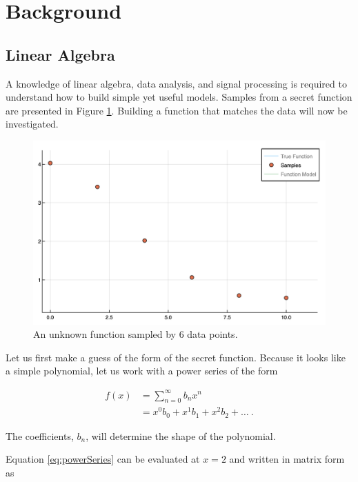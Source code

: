 \section{Background}\label{Sect:background}
\subsection{Linear Algebra}\label{Sect:linearAlgebra}
A knowledge of linear algebra, data analysis, and signal processing is required to understand how to build simple yet useful models. Samples from a secret function are presented in Figure \ref{fig:func1Samples}. Building a function that matches the data will now be investigated.

\begin{figure}[h]
\includegraphics[scale = 0.4]{Figures/func1Samples}
\caption{An unknown function sampled by 6 data points.
\label{fig:func1Samples}} 
\end{figure}

\par Let us first make a guess of the form of the secret function. Because it looks like a simple polynomial, let us work with a power series of the form

\begin{align}
f(x) &= \sum_{n=0}^\infty b_n x^n
	\label{eq:powerSum}\\ 
&= x^0b_0 + x^1b_1 + x^2b_2 + \ldots\ .
	\label{eq:powerSeries}
\end{align}

\par The coefficients, $b_n$, will determine the shape of the polynomial.

Equation \ref{eq:powerSeries} can be evaluated at $x=2$ and written in matrix form as

